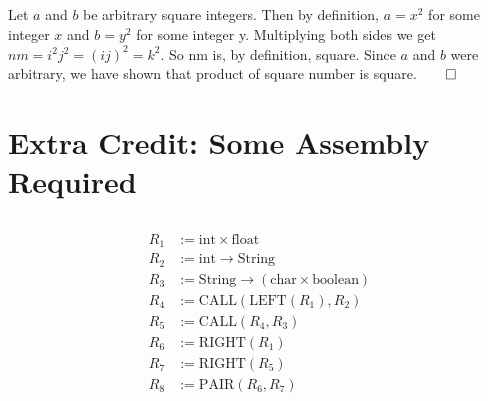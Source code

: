\documentclass[11pt]{article}
\def\imp{\rightarrow}
\begin{document}
\subsection{} %
Let $a$ and $b$ be arbitrary square integers. 
Then by definition, $a = x^2$ for some integer $x$ and $b = y^2$ for some integer y. Multiplying both sides we get $nm = i^2 j^2 = (ij)^2 = k^2$. So nm is, by definition, square. Since $a$ and $b$ were arbitrary, we have shown that product of square number is square.$\qed$

\section{Extra Credit: Some Assembly Required} %
\subsection{} %
\begin{align*}
	R_1 &:= \text{int} \times \text{float} \\
	R_2 &:= \text{int} \imp \text{String} \\
	R_3 &:= \text{String} \imp (\text{char} \times \text{boolean}) \\
	R_4 &:= \text{CALL}(\text{LEFT}(R_1), R_2) \tag*{// String} \\
	R_5 &:= \text{CALL}(R_4, R_3) \tag*{// (char $\times$ boolean)} \\
	R_6 &:= \text{RIGHT}(R_1) \tag*{// float} \\
	R_7 &:= \text{RIGHT}(R_5) \tag*{// boolean} \\
	R_8 &:= \text{PAIR}(R_6, R_7) \tag*{// (float $\times$ boolean)} \\
\end{align*}
\end{document}
